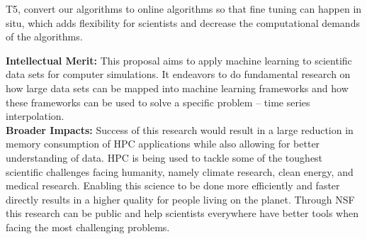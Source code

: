 \documentclass[12pt]{article}
\begin{document}
T5, convert our algorithms to online algorithms so
that fine tuning can happen in situ, which adds flexibility for scientists
and decrease the computational demands of the algorithms. 


\textbf{Intellectual Merit:}
This proposal aims to apply machine learning to scientific data sets for
computer simulations. It endeavors to do fundamental research on how large data
sets can be mapped into machine learning frameworks and how these frameworks can
be used to solve a specific problem -- time series interpolation. 
%
\\\textbf{Broader Impacts:} 
Success of this research would result in a large reduction in memory consumption
of HPC applications while also allowing for better understanding of data. HPC is
being used to tackle some of the toughest scientific challenges facing humanity,
namely climate research, clean energy, and medical research. Enabling this
science to be done more efficiently and faster directly results in a higher
quality for people living on the planet. Through NSF this research can be public
and help scientists everywhere have better tools when facing the most
challenging problems.


\scriptsize


%
%
\end{document}
